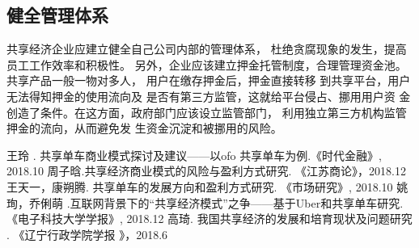 \documentclass[a4paper,oneside,12pt]{article}
\begin{document}
\subsection{健全管理体系}
共享经济企业应建立健全自己公司内部的管理体系，
杜绝贪腐现象的发生，提高员工工作效率和积极性。
另外，企业应该建立押金托管制度，合理管理资金池。共享产品一般一物对多人，
用户在缴存押金后，押金直接转移
到共享平台，用户无法得知押金的使用流向及
是否有第三方监管，这就给平台侵占、挪用用户资
金创造了条件。在这方面，政府部门应该设立监管部门，
利用独立第三方机构监管押金的流向，从而避免发
生资金沉淀和被挪用的风险。






\begin{thebibliography}{00}
  王玲 . 共享单车商业模式探讨及建议——以ofo 共享单车为例.《时代金融》, 2018.10
   周子晗.共享经济商业模式的风险与盈利方式研究. 《江苏商论》，2018.12
   王天一，康朔腾. 共享单车的发展方向和盈利方式研究. 《市场研究》, 2018.10
   姚珣，乔俐萌 .互联网背景下的“共享经济模式”之争——基于Uber和共享单车研究.《电子科技大学学报》, 2018.12
   高琦. 我国共享经济的发展和培育现状及问题研究 . 《辽宁行政学院学报 》，2018.6
\end{thebibliography}
\end{document}
